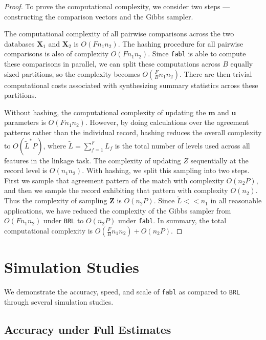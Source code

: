 \documentclass[12pt,letterpaper]{article}
\newcommand{\1}[1]{\mathbb{I}\!\left[#1\right]} %
\begin{document}
\begin{proof}
To prove the computational complexity, we consider two steps --- constructing the comparison vectors and the Gibbs sampler. 

The computational complexity of all pairwise comparisons across the two databases $\bm{X}_1$ and $\bm{X}_2$ is $O(F n_1 n_2)$. The hashing procedure for all pairwise comparisons is also of complexity $O(F n_1 n_2)$. Since \texttt{fabl} is able to compute these comparisons in parallel, we can split these computations across $B$ equally sized partitions, so the complexity becomes $O(\frac{F}{B} n_1 n_2)$. There are then trivial computational costs associated with synthesizing summary statistics across these partitions. 

Without hashing, the computational complexity of updating the $\bm{m}$ and $\bm{u}$ parameters is $O(F n_1 n_2)$. However, by doing calculations over the agreement patterns rather than the individual record, hashing reduces the overall complexity to $O(\tilde{L}^{*}P)$, where $\tilde{L} = \sum_{f=1}^F L_f$ is the total number of levels used across all features in the linkage task. The complexity of updating $Z$ sequentially at the record level is $O(n_1 n_2)$. With hashing, we split this sampling into two steps. First we sample that agreement pattern of the match with complexity $O(n_2 P)$, and then we sample the record exhibiting that pattern with complexity $O(n_2)$. Thus the complexity of sampling $\bm{Z}$ is $O(n_2 P)$. Since $\tilde{L} << n_1$ in all reasonable applications, we have reduced the complexity of the Gibbs sampler from $O(F n_1 n_2)$ under \texttt{BRL} to $O(n_2 P)$ under \texttt{fabl}.
In summary, the total computational complexity is $O(\frac{F}{B} n_1 n_2) + O(n_2 P).$
\end{proof} 

\section{Simulation Studies}
\label{sec:simulations}

We demonstrate the accuracy, speed, and scale of \texttt{fabl} as compared to \texttt{BRL} through several simulation studies. 

\hypertarget{accuracy}{%
	\subsection{Accuracy under Full Estimates}\label{accuracy}}
\end{document}
